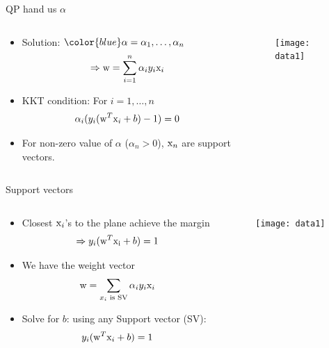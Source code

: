 



\begin{frame}{QP hand us $\alpha$}
\begin{columns}
\begin{column}{7cm}
\begin{itemize}
\item Solution: ${\color{blue}\alpha} =\alpha_1,\ldots,\alpha_n$
\[\Rightarrow {\rm w}=\sum_{i=1}^n \alpha_i y_i {\rm x}_i\]

\item KKT condition: For $i=1,\ldots,n$
\[\alpha_i(y_i({\rm w}^T{\rm x}_i+b)-1)=0\]

\item For non-zero value of $\alpha$ ($\alpha_n>0$), ${\rm x}_n$ are support vectors.
\end{itemize}
\end{column}
\begin{column}{7cm}
\begin{figure}
\texttt{[image: data1]}
\end{figure}
\end{column}
\end{columns}
\end{frame}

\begin{frame}{Support vectors}
\begin{columns}
\begin{column}{7cm}
\begin{itemize}
\item Closest ${\rm x}_i$'s to the plane achieve the margin
\[\Rightarrow y_i({\rm w}^T{\rm x_i}+b)=1\]

\item We have the weight vector
\[{\rm w}=\sum_{{x_i} \text{ is SV}}\alpha_iy_i{\rm x}_i\]

\item {\color{mycolor1}Solve for $b$}: using any Support vector (SV):
\[y_i({\rm w}^T{\rm x}_i +b)=1\]
\end{itemize}
\end{column}
\begin{column}{7cm}
\begin{figure}
\texttt{[image: data1]}
\end{figure}
\end{column}
\end{columns}
\end{frame}

